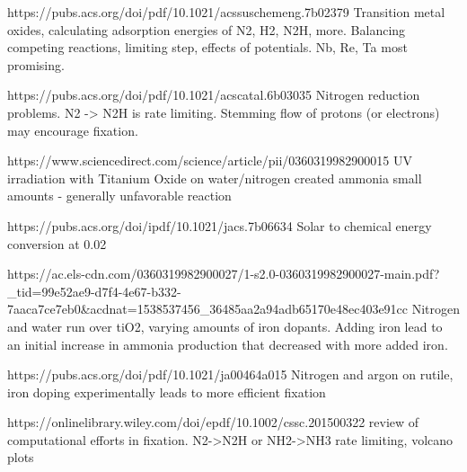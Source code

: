https://pubs.acs.org/doi/pdf/10.1021/acssuschemeng.7b02379
Transition metal oxides, calculating adsorption energies of N2, H2, N2H, more. Balancing competing reactions, limiting step, effects of potentials. Nb, Re, Ta most promising.

https://pubs.acs.org/doi/pdf/10.1021/acscatal.6b03035
Nitrogen reduction problems. N2 -> N2H is rate limiting. Stemming flow of protons (or electrons) may encourage fixation.

https://www.sciencedirect.com/science/article/pii/0360319982900015
UV irradiation with Titanium Oxide on water/nitrogen created ammonia
small amounts - generally unfavorable reaction

https://pubs.acs.org/doi/ipdf/10.1021/jacs.7b06634
Solar to chemical energy conversion at 0.02%


https://ac.els-cdn.com/0360319982900027/1-s2.0-0360319982900027-main.pdf?_tid=99e52ae9-d7f4-4e67-b332-7aaca7ce7eb0&acdnat=1538537456_36485aa2a94adb65170e48ec403e91cc
Nitrogen and water run over tiO2, varying amounts of iron dopants. Adding iron lead to an initial increase in ammonia production that decreased with more added iron.

https://pubs.acs.org/doi/pdf/10.1021/ja00464a015
Nitrogen and argon on rutile, iron doping experimentally leads to more efficient fixation

https://onlinelibrary.wiley.com/doi/epdf/10.1002/cssc.201500322
review of computational efforts in fixation. N2->N2H or NH2->NH3 rate limiting, volcano plots 